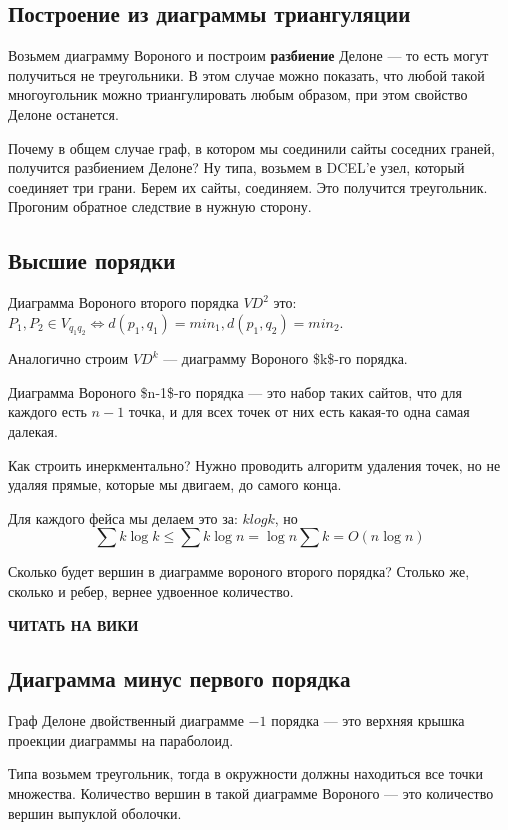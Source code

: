 \documentclass[11pt]{article}
\begin{document}
\subsection{Построение из диаграммы триангуляции}
\label{sec:orgheadline55}
Возьмем диаграмму Вороного и построим \textbf{разбиение} Делоне --- то есть
могут получиться не треугольники. В этом случае можно показать, что
любой такой многоугольник можно триангулировать любым образом, при
этом свойство Делоне останется.

Почему в общем случае граф, в котором мы соединили сайты соседних
граней, получится разбиением Делоне? Ну типа, возьмем в DCEL'е
узел, который соединяет три грани. Берем их сайты, соединяем. Это
получится треугольник. Прогоним обратное следствие в нужную
сторону.
\subsection{Высшие порядки}
\label{sec:orgheadline56}
Диаграмма Вороного второго порядка \(VD^2\) это: \(P_1, P_2 \in
   V_{q_1q_2} ⇔ d(p_1, q_1) = min_1, d(p_1,q_2) = min_2\).

Аналогично строим \(VD^k\) --- диаграмму Вороного \$k\$-го порядка.

Диаграмма Вороного \$n-1\$-го порядка --- это набор таких сайтов, что
для каждого есть \(n-1\) точка, и для всех точек от них есть какая-то
одна самая далекая.

Как строить инеркментально? Нужно проводить алгоритм удаления
точек, но не удаляя прямые, которые мы двигаем, до самого конца.

Для каждого фейса мы делаем это за: \(klogk\), но \[\sum{k\log{k}}
   \le \sum{k\log{n}} = \log{n}\sum{k} = O(n\log{n})\]

Сколько будет вершин в диаграмме вороного второго порядка? Столько
же, сколько и ребер, вернее удвоенное количество.

\textbf{ЧИТАТЬ НА ВИКИ}
\subsection{Диаграмма минус первого порядка}
\label{sec:orgheadline57}
Граф Делоне двойственный диаграмме \(-1\) порядка --- это верхняя крышка
проекции диаграммы на параболоид.

Типа возьмем треугольник, тогда в окружности должны находиться все
точки множества. Количество вершин в такой диаграмме Вороного ---
это количество вершин выпуклой оболочки.
\end{document}
